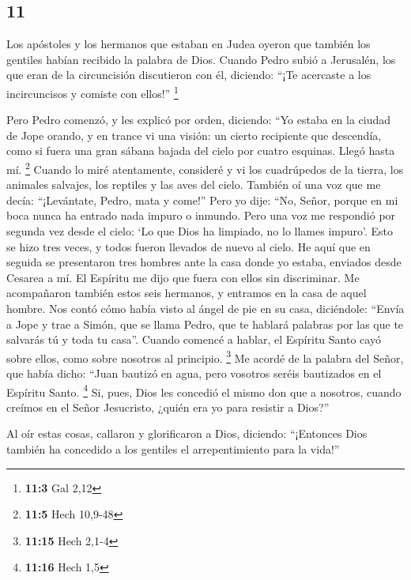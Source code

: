 \begin{paracol}{2}
\hypertarget{section-20}{%
\section{11}\label{section-20}}

 Los apóstoles y los hermanos que estaban en Judea oyeron
que también los gentiles habían recibido la palabra de Dios.
 Cuando Pedro subió a Jerusalén, los que eran de la
circuncisión discutieron con él,  diciendo: ``¡Te
acercaste a los incircuncisos y comiste con ellos!'' \footnote{\textbf{11:3}
  Gal 2,12}

 Pero Pedro comenzó, y les explicó por orden, diciendo:
 ``Yo estaba en la ciudad de Jope orando, y en trance vi
una visión: un cierto recipiente que descendía, como si fuera una gran
sábana bajada del cielo por cuatro esquinas. Llegó hasta mí. \footnote{\textbf{11:5}
  Hech 10,9-48}  Cuando lo miré atentamente, consideré y
vi los cuadrúpedos de la tierra, los animales salvajes, los reptiles y
las aves del cielo.  También oí una voz que me decía:
``¡Levántate, Pedro, mata y come!''  Pero yo dije: ``No,
Señor, porque en mi boca nunca ha entrado nada impuro o inmundo.
 Pero una voz me respondió por segunda vez desde el cielo:
`Lo que Dios ha limpiado, no lo llames impuro'.  Esto se
hizo tres veces, y todos fueron llevados de nuevo al cielo.
 He aquí que en seguida se presentaron tres hombres ante
la casa donde yo estaba, enviados desde Cesarea a mí.  El
Espíritu me dijo que fuera con ellos sin discriminar. Me acompañaron
también estos seis hermanos, y entramos en la casa de aquel hombre.
 Nos contó cómo había visto al ángel de pie en su casa,
diciéndole: ``Envía a Jope y trae a Simón, que se llama Pedro,
 que te hablará palabras por las que te salvarás tú y
toda tu casa''.  Cuando comencé a hablar, el Espíritu
Santo cayó sobre ellos, como sobre nosotros al principio. \footnote{\textbf{11:15}
  Hech 2,1-4}  Me acordé de la palabra del Señor, que
había dicho: ``Juan bautizó en agua, pero vosotros seréis bautizados en
el Espíritu Santo. \footnote{\textbf{11:16} Hech 1,5} 
Si, pues, Dios les concedió el mismo don que a nosotros, cuando creímos
en el Señor Jesucristo, ¿quién era yo para resistir a Dios?''

 Al oír estas cosas, callaron y glorificaron a Dios,
diciendo: ``¡Entonces Dios también ha concedido a los gentiles el
arrepentimiento para la vida!''


\end{paracol}
